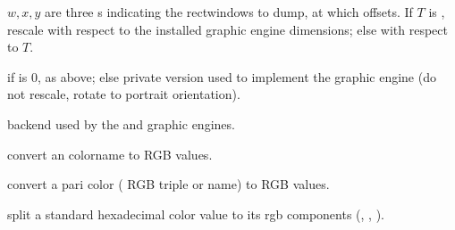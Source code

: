 $w,x,y$ are three s indicating the rectwindows to dump, at
which offsets. If $T$ is , rescale with respect to the installed
graphic engine dimensions; else with respect to $T$.


if  is $0$, as above; else private version used to implement
the  graphic engine (do not rescale, rotate to portrait
orientation).



backend used by the  and  graphic engines.

 convert
an  colorname to RGB values.

 convert a pari color
( RGB triple or  name) to RGB values.

 split a standard
hexadecimal color value  to its rgb components (,
, ).
\newpage
